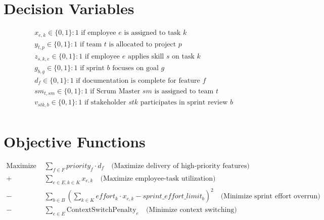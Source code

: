 \documentclass{article}
\begin{document}
\section*{Decision Variables}
\begin{align*}
& x_{e,k} \in \{0,1\}: \text{1 if employee } e \text{ is assigned to task } k \\
& y_{t,p} \in \{0,1\}: \text{1 if team } t \text{ is allocated to project } p \\
& z_{s,k,e} \in \{0,1\}: \text{1 if employee } e \text{ applies skill } s \text{ on task } k \\
& g_{b,g} \in \{0,1\}: \text{1 if sprint } b \text{ focuses on goal } g \\
& d_{f} \in \{0,1\}: \text{1 if documentation is complete for feature } f \\
& sm_{t,sm} \in \{0,1\}: \text{1 if Scrum Master } sm \text{ is assigned to team } t \\
& v_{stk,b} \in \{0,1\}: \text{1 if stakeholder } stk \text{ participates in sprint review } b \\
\end{align*}

\section*{Objective Functions}
\begin{align*}
\text{Maximize } & \sum_{f \in F} priority_f \cdot d_f \quad \text{(Maximize delivery of high-priority features)} \\
+ & \sum_{e \in E, k \in K} x_{e,k} \quad \text{(Maximize employee-task utilization)} \\
- & \sum_{b \in B} \left(\sum_{k \in K} effort_k \cdot x_{e,k} - sprint\_effort\_limit_b\right)^2 \quad \text{(Minimize sprint effort overrun)} \\
- & \sum_{e \in E} \text{ContextSwitchPenalty}_e \quad \text{(Minimize context switching)} \\
\end{align*}
\end{document}
